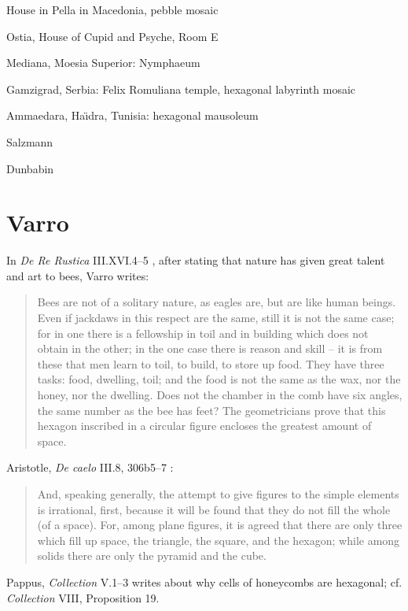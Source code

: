 \documentclass{amsart}
\theoremstyle{definition}
\begin{document}
House in Pella in Macedonia, pebble mosaic

Ostia, House of Cupid and Psyche, Room E \cite{ostiaIV}

Mediana, Moesia Superior: Nymphaeum

Gamzigrad, Serbia: Felix Romuliana temple, hexagonal labyrinth mosaic 

Ammaedara, Ha{\"\i}dra, Tunisia: hexagonal mausoleum

Salzmann \cite{salzmann}

Dunbabin \cite{dunbabin}





\section{Varro}
In {\em De Re Rustica} III.XVI.4--5 \cite[p.~501]{varro}, after stating that nature has given great talent and art to bees, Varro writes:
 
\begin{quote}
Bees are not of a solitary nature, as eagles are, but are like human beings. Even if jackdaws in this respect are the same, still it is not the same case; for in one there is a fellowship
in toil and in building which does not obtain in the other; in the one case there is reason and skill -- it is from these that men learn to toil, to build, to store up food. They have three 
tasks: food, dwelling, toil; and the food is not the same as the wax, nor the honey, nor the dwelling. Does not the chamber in the comb have six angles, the same number as the bee 
has feet? The geometricians prove that this hexagon inscribed in a circular figure encloses the greatest amount of space.
\end{quote}

Aristotle, {\em De caelo} III.8, 306b5--7 \cite[p.~177]{aristotle}:

\begin{quote}
And, speaking generally, the attempt to give figures to the simple
elements is irrational, first, because it will be found that they do
not fill the whole (of a space). For, among plane figures, it is agreed
that there are only three which fill up space, the triangle, the square,
and the hexagon; while among solids there are only the pyramid
and the cube.
\end{quote}


Pappus, {\em Collection} V.1--3 \cite[pp.~589--593]{thomasII} writes about why cells of honeycombs are hexagonal; cf.
{\em Collection} VIII, Proposition 19.
\end{document}
